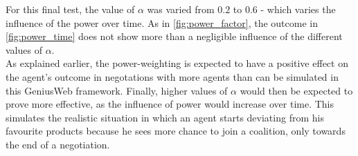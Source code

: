        

       For this final test, the value of $\alpha$ was varied from $0.2$ to $0.6$ - which varies the influence of the power over time. As in \autoref{fig:power_factor}, the outcome in \autoref{fig:power_time} does not show more than a negligible influence of the different values of $\alpha$. \\
       
       As explained earlier, the power-weighting is expected to have a positive effect on the agent's outcome in negotations with more agents than can be simulated in this GeniusWeb framework. Finally, higher values of $\alpha$ would then be expected to prove more effective, as the influence of power would  increase over time. This simulates the realistic situation in which an agent starts deviating from his favourite products because he sees more chance to join a coalition, only towards the end of a negotiation. 
        
